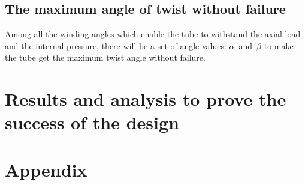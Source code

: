 \documentclass[12pt]{article}
\begin{document}
\subsection{The maximum angle of twist without failure}
\noindent Among all the winding angles which enable the tube to withstand the axial load and the internal pressure, there will be a set of angle values: $\alpha$\ and\ $\beta$ to make the tube get the maximum twist angle without failure.

\section{ Results and analysis to prove the success of the design }

\appendix
\section{Appendix}
\end{document}

